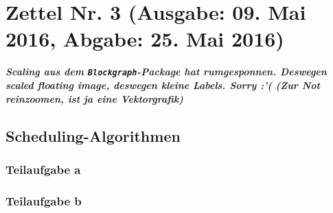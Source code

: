 \documentclass{article}
\newcommand{\sect}[3]{	%
	\newpage
	\section*{Zettel Nr. #1 (Ausgabe: #2, Abgabe: #3)}
}
\newcommand{\sus}[1]{	%
	\subsection*{#1}
}
\newcommand{\sss}[1]{	%
	\subsubsection*{Teilaufgabe #1}
}
\begin{document}
\sect{3}{09. Mai 2016}{25. Mai 2016}
\textit{\textbf{Scaling aus dem \texttt{Blockgraph}-Package hat rumgesponnen. Deswegen scaled floating image, deswegen kleine Labels. Sorry :'( (Zur Not reinzoomen, ist ja eine Vektorgrafik)}}
\sus{Scheduling-Algorithmen}
\sss{a}
\sss{b}
\end{document}
